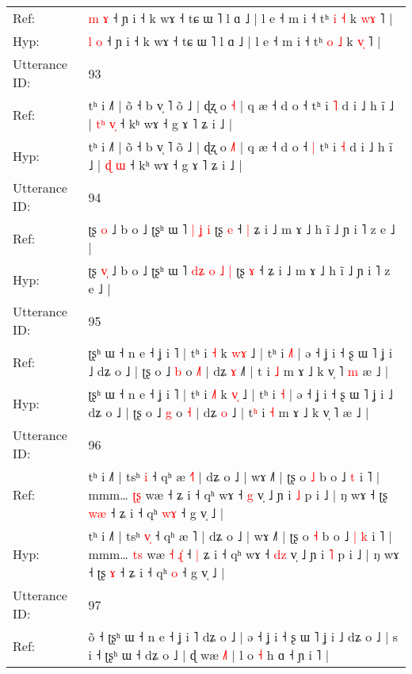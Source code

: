 \documentclass[10pt]{article}
\DeclareRobustCommand{\hl}[1]{{\textcolor{red}{#1}}}
\begin{document}
\begin{longtable}{ll}
Ref: & \hl{m} \hl{ɤ} ˧ ɲ i ˧ k wɤ ˧ tɕ ɯ ˥ l ɑ ˩ | l e ˧ m i ˧ tʰ \hl{i} \hl{˧} k \hl{w}\hl{ɤ} ˥ |
 \\
Hyp: & \hl{l} \hl{o} ˧ ɲ i ˧ k wɤ ˧ tɕ ɯ ˥ l ɑ ˩ | l e ˧ m i ˧ tʰ \hl{o} \hl{˩} k \hl{v}\hl{̩} ˥ |
 \\
\midrule
Utterance ID: & 93 \\
Ref: & tʰ i ˩˥ | õ ˧ b v̩ ˥ õ ˩ | ɖʐ o \hl{}\hl{˧} | q æ ˧ d o ˧\hl{}\hl{} tʰ i \hl{˥} d i ˩ h ĩ ˩ | \hl{t}\hl{ʰ} \hl{v}\hl{̩} ˧ kʰ wɤ ˧ g ɤ ˥ ʑ i ˩ |
 \\
Hyp: & tʰ i ˩˥ | õ ˧ b v̩ ˥ õ ˩ | ɖʐ o \hl{˩}\hl{˥} | q æ ˧ d o ˧\hl{ }\hl{|} tʰ i \hl{˧} d i ˩ h ĩ ˩ | \hl{}\hl{ɖ} \hl{}\hl{ɯ} ˧ kʰ wɤ ˧ g ɤ ˥ ʑ i ˩ |
 \\
\midrule
Utterance ID: & 94 \\
Ref: & ʈʂ \hl{}\hl{o} ˩ b o ˩ ʈʂʰ ɯ ˥\hl{}\hl{}\hl{} \hl{|} \hl{ʝ} \hl{i} ʈʂ \hl{e} ˧\hl{ }\hl{|} ʑ i ˩ m ɤ ˩ h ĩ ˩ ɲ i ˥ z e ˩ |
 \\
Hyp: & ʈʂ \hl{v}\hl{̩} ˩ b o ˩ ʈʂʰ ɯ ˥\hl{ }\hl{d}\hl{ʑ} \hl{o} \hl{˩} \hl{|} ʈʂ \hl{ɤ} ˧\hl{}\hl{} ʑ i ˩ m ɤ ˩ h ĩ ˩ ɲ i ˥ z e ˩ |
 \\
\midrule
Utterance ID: & 95 \\
Ref: & ʈʂʰ ɯ ˧ n e ˧ ʝ i ˥ | tʰ i \hl{}\hl{˧} k \hl{w}\hl{ɤ} ˩ | tʰ i \hl{˩}\hl{˥} | ə ˧ ʝ i ˧ ʂ ɯ ˥ ʝ i ˩ dʑ o ˩ | ʈʂ o ˩ \hl{b} o \hl{˩}\hl{˥} | dʑ \hl{ɤ} ˩\hl{˥} | t\hl{} i \hl{˩} m ɤ ˩ k v̩ ˥\hl{ }\hl{m} æ ˩ |
 \\
Hyp: & ʈʂʰ ɯ ˧ n e ˧ ʝ i ˥ | tʰ i \hl{˩}\hl{˥} k \hl{v}\hl{̩} ˩ | tʰ i \hl{}\hl{˧} | ə ˧ ʝ i ˧ ʂ ɯ ˥ ʝ i ˩ dʑ o ˩ | ʈʂ o ˩ \hl{g} o \hl{}\hl{˧} | dʑ \hl{o} ˩\hl{} | t\hl{ʰ} i \hl{˧} m ɤ ˩ k v̩ ˥\hl{}\hl{} æ ˩ |
 \\
\midrule
Utterance ID: & 96 \\
Ref: & tʰ i ˩˥ | tsʰ \hl{}\hl{i} ˧ qʰ æ \hl{˧}˥ | dʑ o ˩ | wɤ ˩˥ | ʈʂ o \hl{˩} b o ˩\hl{}\hl{} \hl{t} i ˥ | mmm… \hl{ʈ}\hl{ʂ} wæ\hl{}\hl{}\hl{}\hl{}\hl{} ˧\hl{}\hl{} ʑ i ˧ qʰ wɤ ˧ \hl{}\hl{g} v̩ ˩ ɲ i \hl{˩} p i ˩ | ŋ wɤ ˧ ʈʂ \hl{w}\hl{æ} ˧ ʑ i ˧ qʰ \hl{w}\hl{ɤ} ˧ g v̩ ˩ |
 \\
Hyp: & tʰ i ˩˥ | tsʰ \hl{v}\hl{̩} ˧ qʰ æ \hl{}˥ | dʑ o ˩ | wɤ ˩˥ | ʈʂ o \hl{˧} b o ˩\hl{ }\hl{|} \hl{k} i ˥ | mmm… \hl{t}\hl{s} wæ\hl{ }\hl{˧}\hl{ }\hl{ɻ}\hl{̍} ˧\hl{ }\hl{|} ʑ i ˧ qʰ wɤ ˧ \hl{d}\hl{z} v̩ ˩ ɲ i \hl{˥} p i ˩ | ŋ wɤ ˧ ʈʂ \hl{}\hl{ɤ} ˧ ʑ i ˧ qʰ \hl{}\hl{o} ˧ g v̩ ˩ |
 \\
\midrule
Utterance ID: & 97 \\
Ref: & õ ˧ ʈʂʰ ɯ ˧ n e ˧ ʝ i ˥ dʑ o ˩ | ə ˧ ʝ i ˧ ʂ ɯ ˥ ʝ i ˩ dʑ o ˩ | s i ˧ ʈʂʰ ɯ ˧ dʑ o ˩ | ɖ wæ \hl{˩}˥ | l o \hl{˧} h ɑ ˧ ɲ i ˥ |

\end{longtable}
\end{document}
